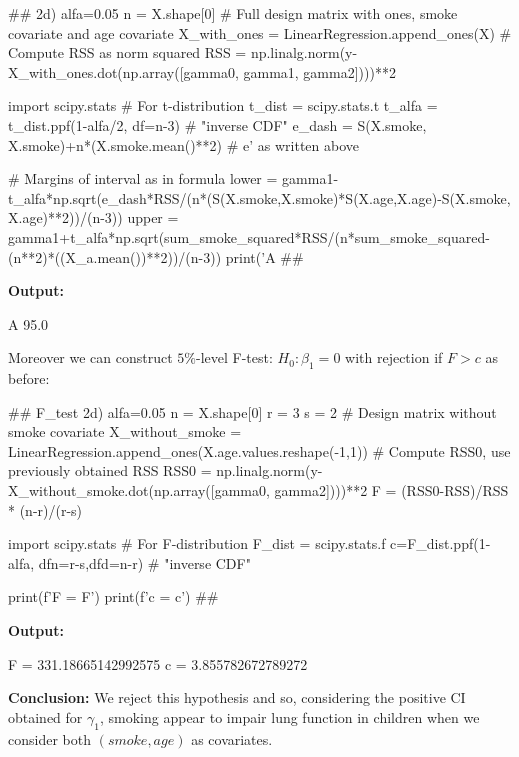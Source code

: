 \documentclass[a4paper]{article}
\begin{document}
\begin{python}
	## 2d)
	alfa=0.05
	n = X.shape[0]
	# Full design matrix with ones, smoke covariate and age covariate
	X_with_ones = LinearRegression.append_ones(X) 
	# Compute RSS as norm squared
	RSS = np.linalg.norm(y-X_with_ones.dot(np.array([gamma0, gamma1, gamma2])))**2
	
	import scipy.stats # For t-distribution
	t_dist = scipy.stats.t
	t_alfa = t_dist.ppf(1-alfa/2, df=n-3) # "inverse CDF"
	e_dash = S(X.smoke, X.smoke)+n*(X.smoke.mean()**2) # e' as written above
	
	# Margins of interval as in formula
	lower = gamma1-t_alfa*np.sqrt(e_dash*RSS/(n*(S(X.smoke,X.smoke)*S(X.age,X.age)-S(X.smoke, X.age)**2))/(n-3))
	upper = gamma1+t_alfa*np.sqrt(sum_smoke_squared*RSS/(n*sum_smoke_squared-(n**2)*((X_a.mean())**2))/(n-3))
	print('A {}%
	##
\end{python}
\textbf{Output:}
\begin{python}
	A 95.0%
\end{python}
Moreover we can construct $5\%$-level F-test: \underline{$H_{0}:\beta_{1}=0$} with rejection if $F>c$ as before:
\begin{python}
	## F_test 2d)
	alfa=0.05
	n = X.shape[0]
	r = 3
	s = 2
	# Design matrix without smoke covariate
	X_without_smoke = LinearRegression.append_ones(X.age.values.reshape(-1,1))
	# Compute RSS0, use previously obtained RSS	
	RSS0 = np.linalg.norm(y-X_without_smoke.dot(np.array([gamma0, gamma2])))**2
	F = (RSS0-RSS)/RSS * (n-r)/(r-s)
	
	import scipy.stats # For F-distribution
	F_dist = scipy.stats.f
	c=F_dist.ppf(1-alfa, dfn=r-s,dfd=n-r) # "inverse CDF"
	
	print(f'F = {F}')
	print(f'c = {c}')
	##
\end{python}
\textbf{Output:}
\begin{python}
	F = 331.18665142992575
	c = 3.855782672789272
\end{python}
\textbf{Conclusion:} We reject this hypothesis and so, considering the positive CI obtained for $\gamma_{1}$, smoking appear to impair lung function in children when we consider both $(smoke, age)$ as covariates.
\newpage
\end{document}
